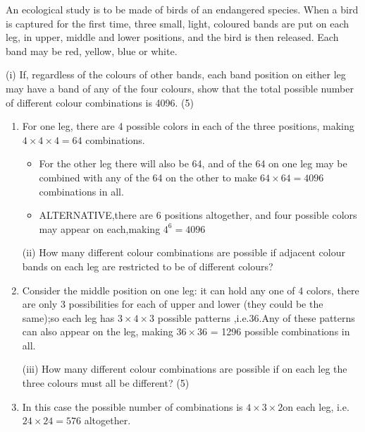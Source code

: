 \documentclass[a4paper,12pt]{article}
\begin{document}
\begin{framed}
An ecological study is to be made of birds of an endangered species.  When a bird is captured for the first time, three small, light, coloured bands are put on each leg, in upper, middle and lower positions, and the bird is then released.  Each band may be red, yellow, blue or white. 

(i) If, regardless of the colours of other bands, each band position on either leg may have a band of any of the four colours, show that the total possible number of different colour combinations is 4096. (5) 
\end{framed}
  

\begin{enumerate}
\item  For one leg, there are 4 possible colors in each of the three positions, making
$4 \times 4 \times 4 = 64$ combinations.
\begin{itemize}
\item For the other leg there will also be 64, and of the 64
on one leg may be combined with any of the 64 on the other to make $64 \times 64 = 4096$
combinations in all.

\item ALTERNATIVE,there are 6 positions altogether, and four possible colors may appear
on each,making $4^6 = 4096$
\end{itemize}

\begin{framed}
(ii) How many different colour combinations are possible if adjacent colour bands on each leg are restricted to be of different colours? 
\end{framed}
 

\item Consider the middle position on one leg: it can hold any one of 4 colors, there
are only 3 possibilities for each of upper and lower (they could be the same);so each leg
has $3 \times 4 \times 3$ possible patterns ,i.e.36.Any of these patterns can also appear on the leg,
making $36 \times 36$ = 1296 possible combinations in all.
\begin{framed}
(iii) How many different colour combinations are possible if on each leg the three colours must all be different? (5) 
 \end{framed}


\item In this case the possible number of combinations is $4\times 3 \times 2 $on each leg, i.e.$24\times
24 = 576$ altogether.


\end{enumerate}
\end{document}
